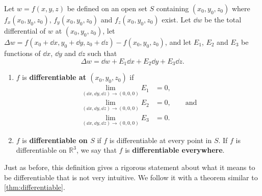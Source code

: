 \begin{definition}\label{def:multi_differentiability3}%
Let $w=f(x,y,z)$ be defined on an open set $S$ containing $(x_0,y_0,z_0)$ where $f_x(x_0,y_0,z_0)$, $f_y(x_0,y_0,z_0)$ and $f_z(x_0,y_0,z_0)$ exist. Let $\dd w$ be the total differential of $w$ at $(x_0,y_0,z_0)$, let $\Delta w = f(x_0+\dd x,y_0+\dd y,z_0+\dd z) - f(x_0,y_0,z_0)$, and let $E_1$, $E_2$ and $E_3$ be functions of $\dd x$, $\dd y$ and $\dd z$  such that
\[\Delta w = \dd w + E_1\dd x + E_2\dd y + E_3\dd z.\]
\begin{enumerate}
	\item $f$ is \textbf{differentiable at $(x_0,y_0,z_0)$} if%
	\begin{align*}
	 \lim_{(\dd x,\dd y,\dd z)\to(0,0,0)}E_1 &=0,\\
	 \lim_{(\dd x,\dd y,\dd z)\to(0,0,0)}E_2 &=0,\qquad\text{and}\\
	 \lim_{(\dd x,\dd y,\dd z)\to(0,0,0)}E_3 &=0.
	\end{align*}
	\item	$f$ is \textbf{differentiable on $S$} if $f$ is differentiable at every point in $S$. If $f$ is differentiable on $\mathbb{R}^3$, we say that $f$ is \textbf{differentiable everywhere}.
\end{enumerate}
\end{definition}

Just as before, this definition gives a rigorous statement about what it means to be differentiable that is not very intuitive. We follow it with a theorem similar to \autoref{thm:differentiable}.


